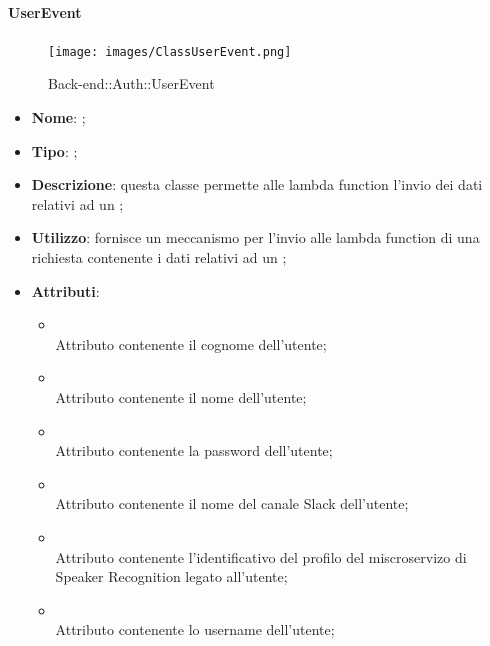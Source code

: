 \hypertarget{UserEvent_label}{\paragraph{UserEvent}}
\begin{figure}[h]
	\centering
	\texttt{[image: images/ClassUserEvent.png]}
	\caption{Back-end::Auth::UserEvent}
\end{figure}
\begin{itemize}
	\item \textbf{Nome}: ;
	\item \textbf{Tipo}: ;
	\item \textbf{Descrizione}: questa classe permette alle lambda function l'invio dei dati relativi ad un ;
	\item \textbf{Utilizzo}: fornisce un meccanismo per l'invio alle lambda function di una richiesta contenente i dati relativi ad un ;
	\item \textbf{Attributi}:
	\begin{itemize}
		\item[]  \\
		Attributo contenente il cognome dell'utente;
		\item[]  \\
		Attributo contenente il nome dell'utente;
		\item[]  \\
		Attributo contenente la password dell'utente;
		\item[]  \\
		Attributo contenente il nome del canale Slack dell'utente;
		\item[]  \\
		Attributo contenente l'identificativo del profilo del miscroservizo di Speaker Recognition legato all'utente;
		\item[]  \\
		Attributo contenente lo username dell'utente;
	\end{itemize}
\end{itemize}

